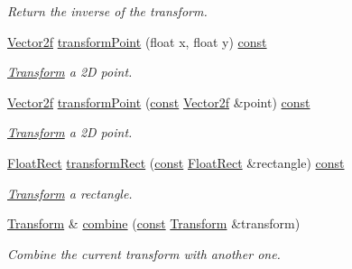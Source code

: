 \begin{DoxyCompactItemize}
\begin{DoxyCompactList}\small\item\em Return the inverse of the transform. \end{DoxyCompactList}\item 
\hyperlink{namespacesf_a80cea3c46537294fd1d8d428566ad8b2}{Vector2f} \hyperlink{classsf_1_1_transform_af20913c6a27087c26192c116397ab40a}{transform\-Point} (float x, float y) \hyperlink{term__entry_8h_a57bd63ce7f9a353488880e3de6692d5a}{const} 
\begin{DoxyCompactList}\small\item\em \hyperlink{classsf_1_1_transform}{Transform} a 2\-D point. \end{DoxyCompactList}\item 
\hyperlink{namespacesf_a80cea3c46537294fd1d8d428566ad8b2}{Vector2f} \hyperlink{classsf_1_1_transform_ac322cd8f6d606598d1aacc4d1d160ad6}{transform\-Point} (\hyperlink{term__entry_8h_a57bd63ce7f9a353488880e3de6692d5a}{const} \hyperlink{namespacesf_a80cea3c46537294fd1d8d428566ad8b2}{Vector2f} \&point) \hyperlink{term__entry_8h_a57bd63ce7f9a353488880e3de6692d5a}{const} 
\begin{DoxyCompactList}\small\item\em \hyperlink{classsf_1_1_transform}{Transform} a 2\-D point. \end{DoxyCompactList}\item 
\hyperlink{namespacesf_ab0d978f5903922a6bdfca1736b71ccc9}{Float\-Rect} \hyperlink{classsf_1_1_transform_a345112559981d988e92b54b7976fca8a}{transform\-Rect} (\hyperlink{term__entry_8h_a57bd63ce7f9a353488880e3de6692d5a}{const} \hyperlink{namespacesf_ab0d978f5903922a6bdfca1736b71ccc9}{Float\-Rect} \&rectangle) \hyperlink{term__entry_8h_a57bd63ce7f9a353488880e3de6692d5a}{const} 
\begin{DoxyCompactList}\small\item\em \hyperlink{classsf_1_1_transform}{Transform} a rectangle. \end{DoxyCompactList}\item 
\hyperlink{classsf_1_1_transform}{Transform} \& \hyperlink{classsf_1_1_transform_acd978f60421a0f839bb9a8263e8877ff}{combine} (\hyperlink{term__entry_8h_a57bd63ce7f9a353488880e3de6692d5a}{const} \hyperlink{classsf_1_1_transform}{Transform} \&transform)
\begin{DoxyCompactList}\small\item\em Combine the current transform with another one. \end{DoxyCompactList}\item 

\end{DoxyCompactItemize}
